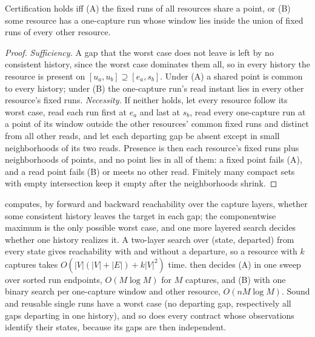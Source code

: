 \begin{lemma}\label{lem:sweep}
Certification holds iff \textup{(A)} the fixed runs of all resources share a
point, or \textup{(B)} some resource has a one-capture run whose window lies
inside the union of fixed runs of every other resource.
\end{lemma}
\begin{proof}
\emph{Sufficiency.} A gap that the worst case does not leave is left by no
consistent history, since the worst case dominates them all, so in every
history the resource is present on $[u_a,u_b]\supseteq[e_a,s_b]$. Under (A) a
shared point is common to every history; under (B) the one-capture run's read
instant lies in every other resource's fixed runs. \emph{Necessity.} If neither
holds, let every resource follow its worst case, read each run first at $e_a$
and last at $s_b$, read every one-capture run at a point of its window outside
the other resources' common fixed runs and distinct from all other reads, and
let each departing gap be absent except in small neighborhoods of its two
reads. Presence is then each resource's fixed runs plus neighborhoods of
points, and no point lies in all of them: a fixed point fails (A), and a read
point fails (B) or meets no other read. Finitely many compact sets with empty
intersection keep it empty after the neighborhoods shrink.
\end{proof}

 computes, by forward and backward reachability over
the capture layers, whether some consistent history leaves the target in each
gap; the componentwise maximum is the only possible worst case, and one more
layered search decides whether one history realizes it. A two-layer search over
(state, departed) from every state gives reachability with and without a
departure, so a resource with $k$ captures takes $O(|V|(|V|+|E|)+k|V|^2)$ time.
 then decides (A) in one sweep over sorted run
endpoints, $O(M\log M)$ for $M$ captures, and (B) with one binary search per
one-capture window and other resource, $O(nM\log M)$. Sound and reusable
single runs have a worst case (no departing gap, respectively all gaps
departing in one history), and so does every contract whose observations
identify their states, because its gaps are then independent.

